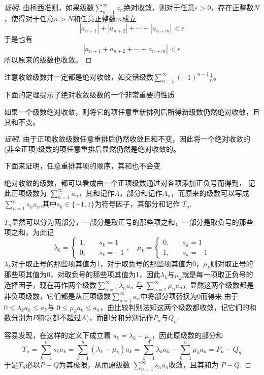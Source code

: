 \begin{proof}[证明]
  由柯西准则，如果级数$\sum_{n=1}^{\infty}a_{n}$绝对收敛，则对于任意$\varepsilon>0$，存在正整数$N$，使得对于任意$n>N$和任意正整数$m$成立
  \[ |a_{n+1}|+|a_{n+2}|+\cdots+|a_{n+m}| < \varepsilon \]
  于是也有
  \[ |a_{n+1}+a_{n+2}+\cdots+a_{n+m}| < \varepsilon \]
  所以原来的级数也收敛。
\end{proof}

注意收敛级数并一定都是绝对收敛，如交错级数$\sum_{n=1}^{\infty}(-1)^{n-1}\frac{1}{n}$。

下面的定理提示了绝对收敛级数的一个非常重要的性质
\begin{theorem}
  如果一个级数绝对收敛，则将它的项任意重新排列后所得新级数仍然绝对收敛，且其和不变。
\end{theorem}

\begin{proof}[证明]
  由于正项收敛级数任意重排后仍然收敛且和不变，因此将一个绝对收敛的(非全正项)级数的项任意重排后显然仍然是绝对收敛的。

  下面来证明，任意重排其项的顺序，其和也不会变.

  绝对收敛的级数，都可以看成由一个正项级数通过对各项添加正负号而得到， 记此正项级数为 $\sum_{n=1}^{\infty}a_n$，其和记作$A$，部分和记作$A_n$，而原来的级数可以写成 $\sum_{n=1}^ns_na_n$,其中$s_k\in\{-1,1\}$为符号因子，其部分和记作 $T_n$.

  $T_n$显然可以分为两部分，一部分是取正号的那些项之和，一部分是取负号的那些项之和，为此记
  \[
    \lambda_k=
    \begin{cases}
      1,  & \quad s_k=1 \\
      0,  & \quad s_k=-1
    \end{cases}
    , \quad
    \mu_k =
    \begin{cases}
     0, \quad & s_k=1 \\
     1, \quad & s_k=-1
    \end{cases}
  \]
  $\lambda_k$对于取正号的那些项其值为1，对于取负号的那些项其值为0，$\mu_k$则对取正号的那些项其值为0，对取负号的那些项其值为1，因此$\lambda_k$与$\mu_k$就是每一项取正负号的选择因子，现在再作两个级数$\sum_{n=1}^{\infty}\lambda_na_{n}$ 与 $\sum_{n=1}^{\infty}\mu_na_n$，显然这两个级数都是非负项级数，它们都是从正项级数$\sum_{n=1}^{\infty}a_n$中将部分项替换为0而得来.由于$ 0 \leqslant \lambda_ka_k \leqslant a_k$与 $ 0 \leqslant \mu_ka_k \leqslant a_k$，由比较判别法知这两个级数都收敛，记它们的和数分别为$P$和$Q$(都不超过$A$)，而部分和分别记作$P_n$与$Q_n$.

  容易发现，在这样的定义下成立着 $s_k=\lambda_k-\mu_k$，因此原级数的部分和
  \[ T_n=\sum_{k=1}^ns_ka_k = \sum_{k=1}^n(\lambda_k-\mu_k)a_k = \sum_{k=1}^n\lambda_ka_k - \sum_{k=1}^n\mu_ka_k = P_n-Q_n \]
  于是$T_n$必以$P-Q$为其极限，从而原级数 $\sum_{n=1}^{\infty}s_na_n$收敛，且其和为 $P-Q$.


\end{proof}
